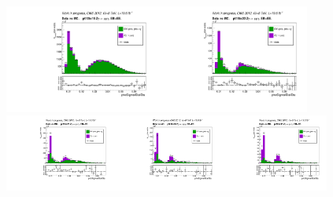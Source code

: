 \begin{figure}[htb]
  \begin{center}
   \includegraphics[width=0.45\textwidth]{../figs/figs_v11/MUON_ZGamma/PrepareYields/c_TotalDATAvsMC_EtaCommon__phoSigmaIEtaIEtaFSR_EXCLUDED_pt10to15_.pdf}\includegraphics[width=0.45\textwidth]{../figs/figs_v11/MUON_ZGamma/PrepareYields/c_TotalDATAvsMC_EtaCommon__phoSigmaIEtaIEtaFSR_EXCLUDED_pt15to20_.pdf}\\
\includegraphics[width=0.32\textwidth]{../figs/figs_v11/MUON_ZGamma/PrepareYields/c_TotalDATAvsMC_EtaCommon__phoSigmaIEtaIEtaFSR_EXCLUDED_pt20to25_.pdf}\includegraphics[width=0.32\textwidth]{../figs/figs_v11/MUON_ZGamma/PrepareYields/c_TotalDATAvsMC_EtaCommon__phoSigmaIEtaIEtaFSR_EXCLUDED_pt25to30_.pdf}\includegraphics[width=0.32\textwidth]{../figs/figs_v11/MUON_ZGamma/PrepareYields/c_TotalDATAvsMC_EtaCommon__phoSigmaIEtaIEtaFSR_EXCLUDED_pt30to35_.pdf}\\

\end{center}
\end{figure}
